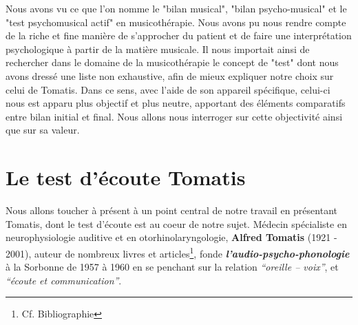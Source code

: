 Nous avons vu ce que l'on nomme le "bilan musical", "bilan psycho-musical" et le  "test psychomusical 
actif" en musicothérapie. Nous avons pu nous rendre compte de la riche et fine manière de s'approcher 
du patient et de faire  une interprétation psychologique à partir de la matière musicale.
Il nous importait ainsi de rechercher dans le domaine de la musicothérapie le concept de "test" dont 
nous 
avons dressé une  liste non exhaustive, %
 afin de mieux 
expliquer notre choix sur celui de  Tomatis. Dans ce sens, avec 
l'aide de son 
appareil spécifique, celui-ci nous est apparu 
plus objectif et plus neutre, apportant 
des éléments comparatifs entre bilan initial et final.
Nous allons nous interroger sur cette 
objectivité ainsi que  sur sa valeur.



\section {Le test d'écoute Tomatis }
Nous allons toucher à présent à un point central de notre travail en présentant
Tomatis, dont le test d'écoute est au coeur de notre sujet.
Médecin spécialiste en neurophysiologie auditive et en
oto\-rhino\-la\-ryn\-go\-lo\-gie, \textbf{Alfred Tomatis} (1921 - 2001),  auteur de 
nombreux  livres et 
articles\footnote{Cf. Bibliographie}, fonde
\textit{\textbf{l'audio-psycho-phonologie}} à la Sorbonne de
1957 à 1960 en  se penchant sur la relation
\textit{``oreille -- voix''}, et \textit{``écoute
et communication''}.
